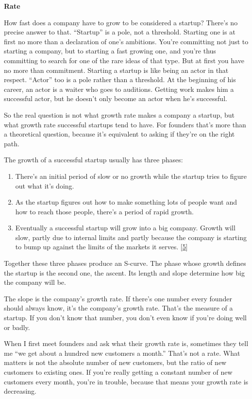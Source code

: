 \textbf{Rate}

How fast does a company have to grow to be considered a startup? There's
no precise answer to that. ``Startup'' is a pole, not a threshold.
Starting one is at first no more than a declaration of one's ambitions.
You're committing not just to starting a company, but to starting a fast
growing one, and you're thus committing to search for one of the rare
ideas of that type. But at first you have no more than commitment.
Starting a startup is like being an actor in that respect. ``Actor'' too
is a pole rather than a threshold. At the beginning of his career, an
actor is a waiter who goes to auditions. Getting work makes him a
successful actor, but he doesn't only become an actor when he's
successful.

So the real question is not what growth rate makes a company a startup,
but what growth rate successful startups tend to have. For founders
that's more than a theoretical question, because it's equivalent to
asking if they're on the right path.

The growth of a successful startup usually has three phases:

\begin{enumerate}
\def\labelenumi{\arabic{enumi}.}
\item
  There's an initial period of slow or no growth while the startup tries
  to figure out what it's doing.
\item
  As the startup figures out how to make something lots of people want
  and how to reach those people, there's a period of rapid growth.
\item
  Eventually a successful startup will grow into a big company. Growth
  will slow, partly due to internal limits and partly because the
  company is starting to bump up against the limits of the markets it
  serves. {[}\hyperref[f5n]{5}{]}
\end{enumerate}

Together these three phases produce an S-curve. The phase whose growth
defines the startup is the second one, the ascent. Its length and slope
determine how big the company will be.

The slope is the company's growth rate. If there's one number every
founder should always know, it's the company's growth rate. That's the
measure of a startup. If you don't know that number, you don't even know
if you're doing well or badly.

When I first meet founders and ask what their growth rate is, sometimes
they tell me ``we get about a hundred new customers a month.'' That's
not a rate. What matters is not the absolute number of new customers,
but the ratio of new customers to existing ones. If you're really
getting a constant number of new customers every month, you're in
trouble, because that means your growth rate is decreasing.

